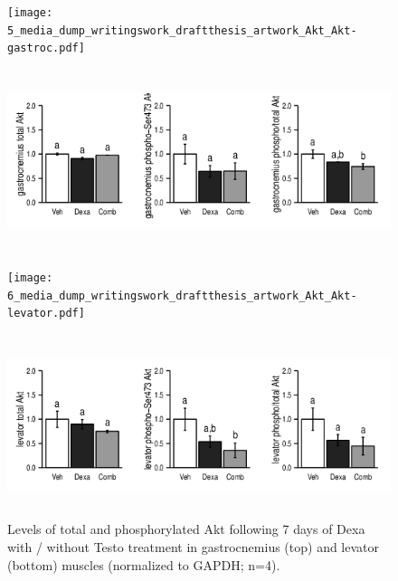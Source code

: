 \documentclass[12pt,english]{report}\usepackage[]{graphicx}\usepackage[]{color}
\newenvironment{knitrout}{}{} %
\begin{document}
\begin{figure}
\begin{minipage}[t][1.8in][c]{6in}%
\texttt{[image: 5\_media\_dump\_writingswork\_draftthesis\_artwork\_Akt\_Akt-gastroc.pdf]}%
\end{minipage}

\begin{minipage}[t][2.2in][c]{6in}%
\begin{knitrout}
\color{fgcolor}
\includegraphics[width=6in,height=2.1in]{figure/gastrocnemiusakt-1} 

\end{knitrout}
%
\end{minipage}

\begin{minipage}[t][1.8in][c]{6in}%
\texttt{[image: 6\_media\_dump\_writingswork\_draftthesis\_artwork\_Akt\_Akt-levator.pdf]}%
\end{minipage}

\begin{minipage}[t][2.2in][c]{6in}%
\begin{knitrout}
\color{fgcolor}
\includegraphics[width=6in,height=2.1in]{figure/levatorakt-1} 

\end{knitrout}
%
\end{minipage}

\protect\caption[Levels of total and phosphorylated Akt following Dexa with / without
Testo treatments.]{Levels of total and phosphorylated Akt following 7 days of Dexa with
/ without Testo treatment in gastrocnemius (top) and levator (bottom)
muscles (normalized to GAPDH; n=4)\label{fig:Akt-phosphorylation}.}
\end{figure}
\end{document}
